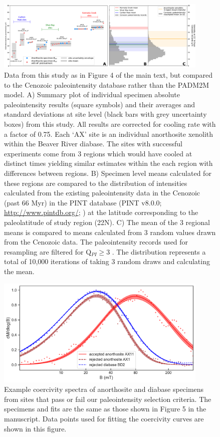 \documentclass[9pt,twoside,lineno]{pnas-new}
\begin{document}
\begin{figure}[h!]
\noindent\includegraphics[width=0.9\textwidth]{Cenozoic_resample_SI.pdf}
\centering
\caption{\footnotesize{Data from this study as in Figure 4 of the main text, but compared to the Cenozoic paleointensity database rather than the PADM2M model. A) Summary plot of individual specimen absolute paleointensity results (square symbols) and their averages and standard deviations at site level (black bars with grey uncertainty boxes) from this study. All results are corrected for cooling rate with a factor of 0.75. Each `AX' site is an individual anorthosite xenolith within the Beaver River diabase. The sites with successful experiments come from 3 regions which would have cooled at distinct times yielding similar estimates within the each region with differences between regions. B) Specimen level means calculated for these regions are compared to the distribution of intensities calculated from the existing paleointensity data in the Cenozoic (past 66 Myr) in the PINT database (PINT v8.0.0; \url{http://www.pintdb.org/}; \citealp{Bono2021a}) at the latitude corresponding to the paleolatitude of study region (22\textdegree N). C) The mean of the 3 regional means is compared to means calculated from 3 random values drawn from the Cenozoic data. The paleointensity records used for resampling are filtered for Q$_{PI} \geq$3 \cite{Biggin2014a}. The distribution represents a total of 10,000 iterations of taking 3 random draws and calculating the mean.}}
\label{fig:Cenozoic_PINT}
\end{figure}

\clearpage

\begin{figure}[h!]
\noindent\includegraphics[width=0.9\textwidth]{example_unmix_plot_with_data.pdf}
\centering
\caption{\footnotesize{Example coercivity spectra of anorthosite and diabase specimens from sites that pass or fail our paleointensity selection criteria. The specimens and fits are the same as those shown in Figure 5 in the manuscript. Data points used for fitting the coercivity curves are shown in this figure. }}
\label{fig:Cenozoic_PINT}
\end{figure}
\end{document}
